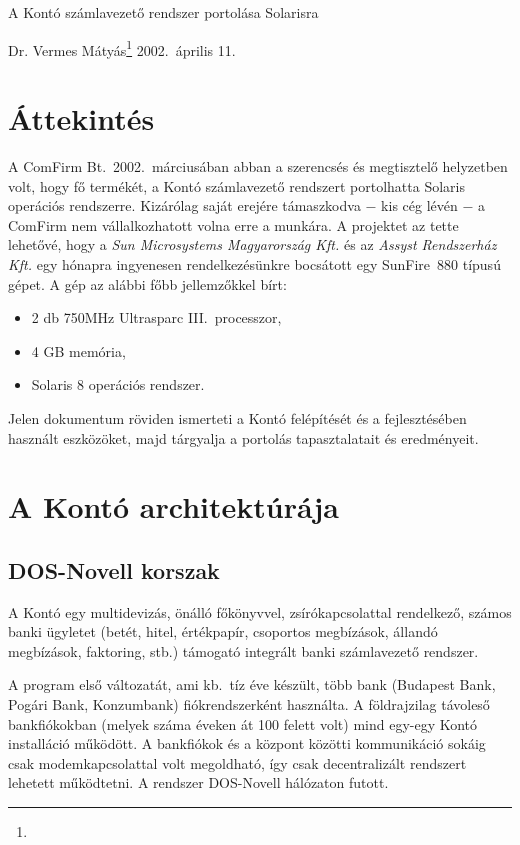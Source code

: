 
\iftth
\def\pcenter#1{#1}
\else
\def\pcenter#1{\parbox{\hsize}{\center #1}}
\fi

\pagetitle%
{\pcenter{A Kontó számlavezető rendszer portolása Solarisra}}%
{Dr. Vermes Mátyás\footnote{\ComFirm}}%
{2002.\ április 11.}

\section{Áttekintés}

A ComFirm Bt.\  2002.\ márciusában abban a szerencsés 
és megtisztelő helyzetben volt, hogy fő termékét, a Kontó
számlavezető rendszert portolhatta Solaris operációs
rendszerre. Kizárólag saját erejére támaszkodva $-$ kis cég lévén $-$
a ComFirm nem vállalkozhatott volna erre a munkára. 
A projektet az tette lehetővé, hogy 
a  \emph{Sun Microsystems Magyarország Kft.} és 
az \emph{Assyst Rendszerház Kft.} 
egy hónapra ingyenesen rendelkezésünkre
bocsátott egy SunFire~880 típusú gépet. 
A gép az alábbi főbb jellemzőkkel bírt:

\begin{itemize}
 \item 2 db 750MHz Ultrasparc III.\ processzor,
 \item 4 GB memória,
 \item Solaris 8 operációs  rendszer.
\end{itemize}

Jelen dokumentum röviden ismerteti a Kontó felépítését és
a fejlesztésében használt eszközöket, majd tárgyalja a portolás 
tapasztalatait és eredményeit.

\section{A Kontó architektúrája}

\subsection{DOS-Novell korszak}

A Kontó egy multidevizás, önálló főkönyvvel, zsírókapcsolattal
rendelkező, számos banki ügyletet (betét, hitel, 
értékpapír, csoportos megbízások, állandó megbízások, faktoring, stb.) 
támogató integrált banki számlavezető rendszer.  

A program első változatát, ami kb.\ tíz éve készült, 
több bank (Budapest Bank, Pogári Bank, Konzumbank) fiókrendszerként 
használta. A földrajzilag távoleső bankfiókokban (melyek száma éveken át 100
felett volt) mind egy-egy Kontó installáció működött. A bankfiókok
és a központ közötti kommunikáció sokáig csak modemkapcsolattal volt 
megoldható, így csak decentralizált rendszert lehetett működtetni. 
A rendszer DOS-Novell hálózaton futott.

